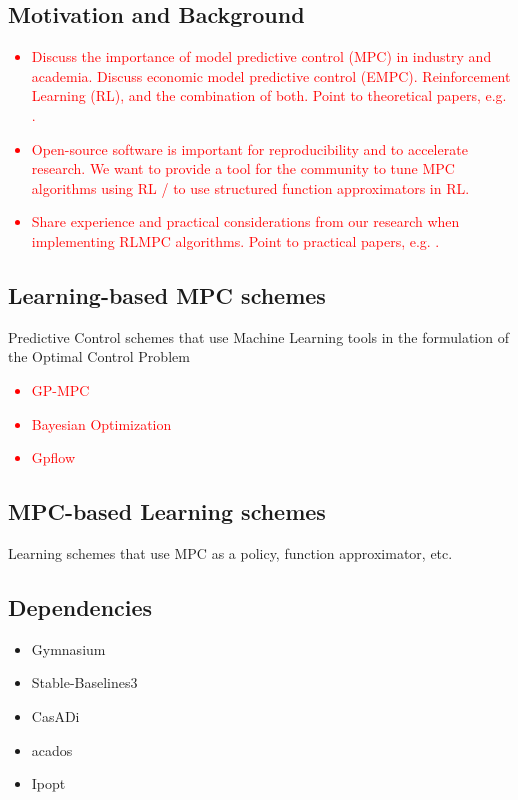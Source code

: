 \documentclass{ifacconf}
\begin{document}
\subsection{Motivation and Background}

\textcolor{red}{
   \begin{itemize}
      \item Discuss the importance of model predictive control (MPC) in industry and academia. Discuss economic model predictive control (EMPC). Reinforcement Learning (RL), and the combination of both. Point to theoretical papers, e.g. \cite{Gros2020}.
      \item Open-source software is important for reproducibility and to accelerate research. We want to provide a tool for the community to tune MPC algorithms using RL / to use structured function approximators in RL.
      \item Share experience and practical considerations from our research when implementing RLMPC algorithms. Point to practical papers, e.g. \citep{Wenqi2021CDCgrid,Wenqi2021CDCShip}.
   \end{itemize}
}


\subsection{Learning-based MPC schemes}

Predictive Control schemes that use Machine Learning tools in the formulation of the Optimal Control Problem

\textcolor{red}{
   \begin{itemize}
      \item GP-MPC~\citep{Berkenkamp2016}
      \item Bayesian Optimization~\cite{Hewing2020a}
      \item Gpflow \citep{GPflow2017}
   \end{itemize}
}

\subsection{MPC-based Learning schemes}

Learning schemes that use MPC as a policy, function approximator, etc.

\cite{Berkenkamp2017}

\subsection{Dependencies}
\begin{itemize}
   \item Gymnasium~\citep{towers_gymnasium_2023}
   \item Stable-Baselines3~\citep{raffin2021reliable}
   \item CasADi~\citep{Andersson2019}
   \item acados~\citep{Verschueren2022}
   \item Ipopt~\citep{Waechter2006}
\end{itemize}
\end{document}
